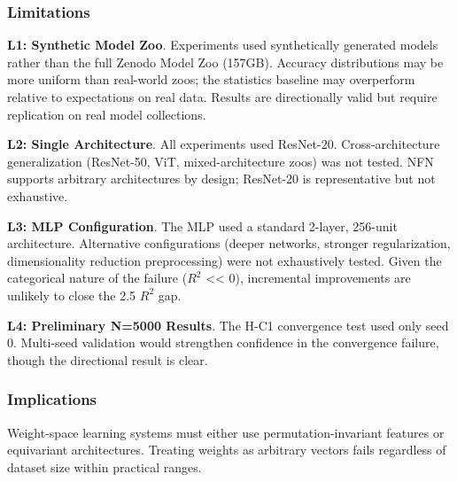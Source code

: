 \subsubsection{Limitations}

\textbf{L1: Synthetic Model Zoo}. Experiments used synthetically generated models rather than the full Zenodo Model Zoo (157GB). Accuracy distributions may be more uniform than real-world zoos; the statistics baseline may overperform relative to expectations on real data. Results are directionally valid but require replication on real model collections.

\textbf{L2: Single Architecture}. All experiments used ResNet-20. Cross-architecture generalization (ResNet-50, ViT, mixed-architecture zoos) was not tested. NFN supports arbitrary architectures by design; ResNet-20 is representative but not exhaustive.

\textbf{L3: MLP Configuration}. The MLP used a standard 2-layer, 256-unit architecture. Alternative configurations (deeper networks, stronger regularization, dimensionality reduction preprocessing) were not exhaustively tested. Given the categorical nature of the failure ($R^2$ << 0), incremental improvements are unlikely to close the 2.5 $R^2$ gap.

\textbf{L4: Preliminary N=5000 Results}. The H-C1 convergence test used only seed 0. Multi-seed validation would strengthen confidence in the convergence failure, though the directional result is clear.

\subsubsection{Implications}

Weight-space learning systems must either use permutation-invariant features or equivariant architectures. Treating weights as arbitrary vectors fails regardless of dataset size within practical ranges.
